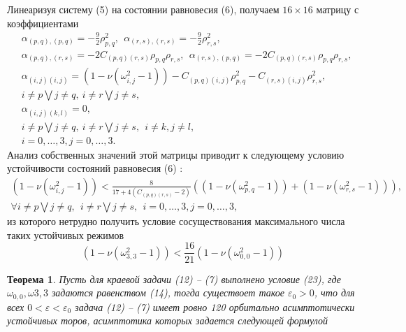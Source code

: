 \documentclass[12pt]{article}  %
\begin{document}
Линеаризуя систему (5) на состоянии равновесия (6), получаем $16\times16$ матрицу с коэффициентами
\begin{equation}
\begin{split}
&\alpha_{(p,q),(p,q)}=-\frac92\rho^2_{p,q}, \ \ \alpha_{(r,s),(r,s)}=-\frac92\rho^2_{r,s},\\
&\alpha_{(p,q),(r,s)}=-2C_{(p,q)(r,s)}\rho_{p,q}\rho_{r,s}, \ \ \alpha_{(r,s),(p,q)}=-2C_{(p,q)(r,s)}\rho_{p,q}\rho_{r,s},\\
&\alpha_{(i,j)(i,j)} = (1 - \nu(\omega^2_{i,j}-1)) - C_{(p,q)(i,j)}\rho^2_{p,q} - C_{(r,s)(i,j)}\rho^2_{r,s},\\
&i\not=p \bigvee j\not=q, \ i\not=r \bigvee j\not=s,\\
&\alpha_{(i,j)(k,l)}=0,\\
&i\not=p \bigvee j\not=q, \ i\not=r \bigvee j\not=s, \ \ i\not=k, j\not=l,\\
&i=0,\dots,3,j=0,\dots,3.
\end{split}
\end{equation}
Анализ собственных значений этой матрицы приводит к следующему условию устойчивости состояний равновесия (6) :
\begin{multline}
(1 - \nu(\omega^2_{i,j}-1)) < \frac8{17+4(C_{(p,q)(r,s)}-2)}((1 - \nu(\omega^2_{p,q}-1))+(1 - \nu(\omega^2_{r,s}-1))),\\
\forall i\not=p\bigvee j\not=q, \ \ i\not=r\bigvee j\not=s, \ \ i=0,\dots,3,j=0,\dots,3,
\end{multline}
из которого нетрудно получить условие сосуществования максимального числа таких устойчивых режимов
\begin{equation}
(1 - \nu(\omega^2_{3,3}-1)) < \frac{16}{21}(1 - \nu(\omega^2_{0,0}-1))
\end{equation}
\newtheorem{Th}{Теорема}
\begin{Th}
	Пусть для краевой задачи (12) \--- (7) выполнено условие (23), где $\omega_{0,0},\omega{3,3}$ задаются равенством (14), тогда существоет такое $\varepsilon_0>0$, что для всех $0<\varepsilon<\varepsilon_0$ задача (12) \--- (7) имеет ровно 120 орбитально асимптотически устойчивых торов, асимптотика которых задается следующей формулой
\end{Th}
\end{document}
